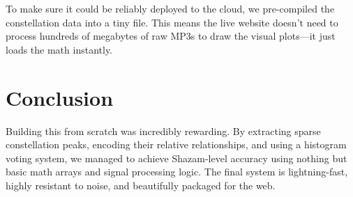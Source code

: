 \documentclass[11pt, a4paper]{article}
\begin{document}
To make sure it could be reliably deployed to the cloud, we pre-compiled the constellation data into a tiny file. This means the live website doesn't need to process hundreds of megabytes of raw MP3s to draw the visual plots—it just loads the math instantly.

\section{Conclusion}
Building this from scratch was incredibly rewarding. By extracting sparse constellation peaks, encoding their relative relationships, and using a histogram voting system, we managed to achieve Shazam-level accuracy using nothing but basic math arrays and signal processing logic. The final system is lightning-fast, highly resistant to noise, and beautifully packaged for the web.
\end{document}

